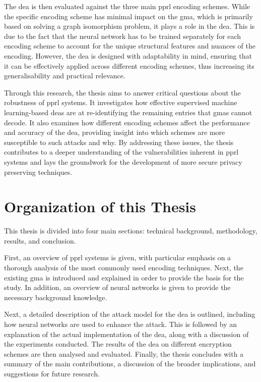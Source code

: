 The \ac{dea} is then evaluated against the three main \ac{pprl} encoding schemes. 
While the specific encoding scheme has minimal impact on the \ac{gma}, which is primarily based on solving a graph isomorphism problem, it plays a role in the \ac{dea}. 
This is due to the fact that the neural network has to be trained separately for each encoding scheme to account for the unique structural features and nuances of the encoding. 
However, the \ac{dea} is designed with adaptability in mind, ensuring that it can be effectively applied across different encoding schemes, thus increasing its generalisability and practical relevance.

Through this research, the thesis aims to answer critical questions about the robustness of \ac{pprl} systems. 
It investigates how effective supervised machine learning-based \ac{dea}s are at re-identifying the remaining entries that \ac{gma}s cannot decode.
It also examines how different encoding schemes affect the performance and accuracy of the \ac{dea}, providing insight into which schemes are more susceptible to such attacks and why. 
By addressing these issues, the thesis contributes to a deeper understanding of the vulnerabilities inherent in \ac{pprl} systems and lays the groundwork for the development of more secure privacy preserving techniques.

\section{Organization of this Thesis}  \label{sec:orga}

This thesis is divided into four main sections: technical background, methodology, results, and conclusion.

First, an overview of \ac{pprl} systems is given, with particular emphasis on a thorough analysis of the most commonly used encoding techniques.
Next, the existing \ac{gma} is introduced and explained in order to provide the basis for the study.
In addition, an overview of neural networks is given to provide the necessary background knowledge.

Next, a detailed description of the attack model for the \ac{dea} is outlined, including how neural networks are used to enhance the attack.
This is followed by an explanation of the actual implementation of the \ac{dea}, along with a discussion of the experiments conducted.
The results of the \ac{dea} on different encryption schemes are then analysed and evaluated.
Finally, the thesis concludes with a summary of the main contributions, a discussion of the broader implications, and suggestions for future research.